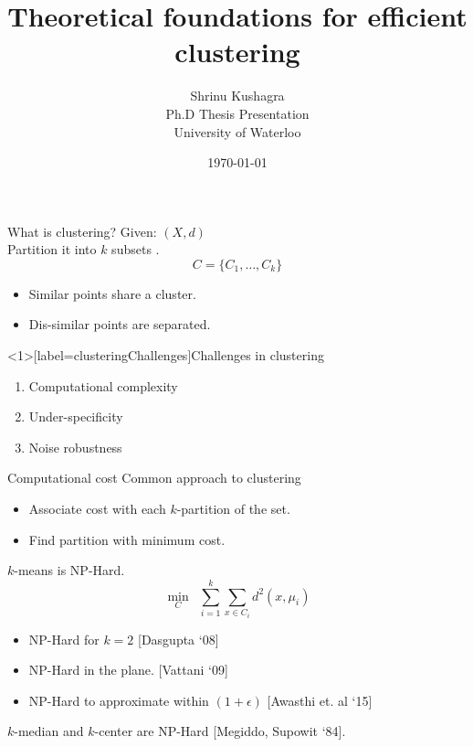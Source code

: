 \documentclass{beamer}
\title[Efficient Clustering]{Theoretical foundations for efficient clustering}
\author[S. Kushagra]{
Shrinu Kushagra\\
\vspace{30pt}Ph.D Thesis Presentation\\
University of Waterloo
}
\date{\today}
\begin{document}
\begin{frame}
  \titlepage
\end{frame}

\begin{frame}{What is clustering?}
	Given: $(X, d)$\\
	\vspace{10pt}Partition it into $k$ subsets .$$C = \{C_1, \ldots, C_k\}$$
	\begin{itemize}
		\item Similar points share a cluster.
		\item Dis-similar points are separated.
	\end{itemize}
\end{frame}

\begin{frame}<1>[label=clusteringChallenges]{Challenges in clustering}
	\begin{enumerate}
		 \item Computational complexity
		\onslide<2> \vspace{20pt}\item  Under-specificity
		\onslide<3>\vspace{20pt}\item Noise robustness
	\end{enumerate}
\end{frame}

\begin{frame}{Computational cost}
	Common approach to clustering
	\begin{itemize}
		\item Associate cost with each $k$-partition of the set.
		\item Find partition with minimum cost.
	\end{itemize}

	\vspace{20pt}$k$-means is NP-Hard.
	$$\min_{C} \enspace\sum_{i=1}^k\sum_{x \in C_i} d^2(x, \mu_i)$$
	\begin{itemize}
		\item NP-Hard for $k=2$ \alert{[Dasgupta `08]}
		\vspace{0pt}\item NP-Hard in the plane. \alert{[Vattani `09]}
		\vspace{0pt}\item NP-Hard to approximate within $(1+\epsilon)$ \alert{[Awasthi et. al `15]}
	\end{itemize} 
	
	\vspace{20pt}$k$-median and $k$-center are NP-Hard \alert{[Megiddo, Supowit `84]}.
\end{frame}
\end{document}
